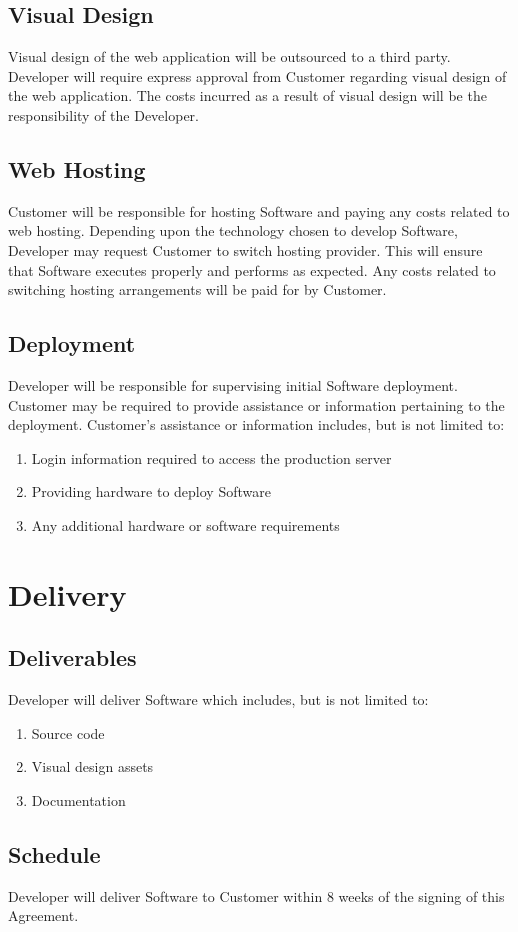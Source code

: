 \documentclass[11pt]{article}
\begin{document}
\subsection{Visual Design}
Visual design of the web application will be outsourced to a third party. Developer will require express approval from Customer regarding visual design of the web application. The costs incurred as a result of visual design will be the responsibility of the Developer.
\subsection{Web Hosting}
Customer will be responsible for hosting Software and paying any costs related to web hosting. Depending upon the technology chosen to develop Software, Developer may request Customer to switch hosting provider. This will ensure that Software executes properly and performs as expected. Any costs related to switching hosting arrangements will be paid for by Customer.
\subsection{Deployment}
Developer will be responsible for supervising initial Software deployment. Customer may be required to provide assistance or information pertaining to the deployment. Customer's assistance or information includes, but is not limited to:
\begin{enumerate}
\item Login information required to access the production server
\item Providing hardware to deploy Software
\item Any additional hardware or software requirements 
\end{enumerate}
\section{Delivery}
\subsection{Deliverables}
Developer will deliver Software which includes, but is not limited to:
\begin{enumerate}
\item Source code
\item Visual design assets 
\item Documentation
\end{enumerate}
\subsection{Schedule}
Developer will deliver Software to Customer within 8 weeks of the signing of this Agreement. 
\end{document}
